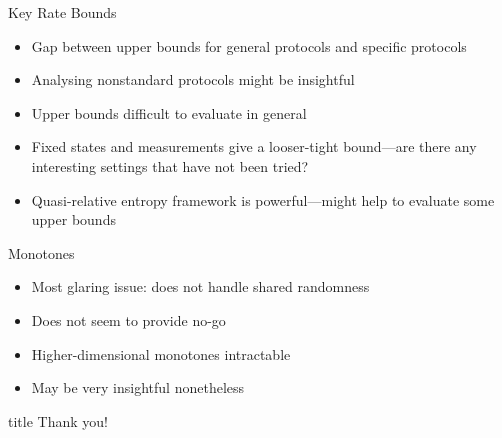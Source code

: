 \documentclass[xcolor=dvipsnames]{beamer}
\newcommand{\?}{\mathrel{?}} %
\begin{document}
\begin{frame}{Key Rate Bounds}
  \begin{itemize}[<+->]
    \item Gap between upper bounds for general protocols and specific protocols
    \item Analysing nonstandard protocols might be insightful
    \item Upper bounds difficult to evaluate in general
    \item Fixed states and measurements give a looser-tight bound---are there any interesting settings that have not been tried?
    \item Quasi-relative entropy framework is powerful---might help to evaluate some upper bounds
  \end{itemize}
\end{frame}

\begin{frame}{Monotones}
  \begin{itemize}[<+->]
    \item Most glaring issue: does not handle shared randomness
    \item Does not seem to provide no-go
    \item Higher-dimensional monotones intractable
    \item May be very insightful nonetheless
  \end{itemize}
\end{frame}

\begin{frame}[c]{}
  \begin{center}
    \begin{beamercolorbox}[sep=8pt,center,shadow=true,rounded=true]{title}
      Thank you!
    \end{beamercolorbox}
  \end{center}
\end{frame}

\end{document}
